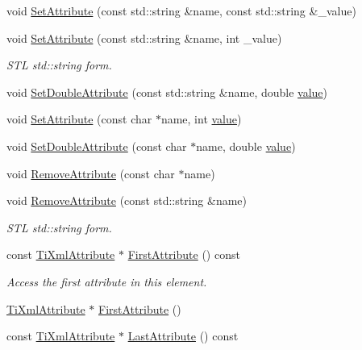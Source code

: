 \begin{DoxyCompactItemize}
\item 
void \hyperlink{class_ti_xml_element_a80ed65b1d194c71c6c9986ae42337d7d}{Set\-Attribute} (const std\-::string \&name, const std\-::string \&\-\_\-value)
\item 
void \hyperlink{class_ti_xml_element_a6f18d54fbe25bbc527936ee65363b3c5}{Set\-Attribute} (const std\-::string \&name, int \-\_\-value)
\begin{DoxyCompactList}\small\item\em S\-T\-L std\-::string form. \end{DoxyCompactList}\item 
void \hyperlink{class_ti_xml_element_ac2112d423b39a93012b241f6baf4d3d3}{Set\-Double\-Attribute} (const std\-::string \&name, double \hyperlink{class_ti_xml_node_aead528b3cedc33c16a6c539872c7cc8b}{value})
\item 
void \hyperlink{class_ti_xml_element_ace6f4be75e373726d4774073d666d1a7}{Set\-Attribute} (const char $\ast$name, int \hyperlink{class_ti_xml_node_aead528b3cedc33c16a6c539872c7cc8b}{value})
\item 
void \hyperlink{class_ti_xml_element_a0d1dd975d75496778177e35abfe0ec0b}{Set\-Double\-Attribute} (const char $\ast$name, double \hyperlink{class_ti_xml_node_aead528b3cedc33c16a6c539872c7cc8b}{value})
\item 
void \hyperlink{class_ti_xml_element_a56979767deca794376b1dfa69a525b2a}{Remove\-Attribute} (const char $\ast$name)
\item 
void \hyperlink{class_ti_xml_element_a1afa6aea716511326a608e4c05df4f3a}{Remove\-Attribute} (const std\-::string \&name)
\begin{DoxyCompactList}\small\item\em S\-T\-L std\-::string form. \end{DoxyCompactList}\item 
const \hyperlink{class_ti_xml_attribute}{Ti\-Xml\-Attribute} $\ast$ \hyperlink{class_ti_xml_element_a516054c9073647d6cb29b6abe9fa0592}{First\-Attribute} () const 
\begin{DoxyCompactList}\small\item\em Access the first attribute in this element. \end{DoxyCompactList}\item 
\hyperlink{class_ti_xml_attribute}{Ti\-Xml\-Attribute} $\ast$ \hyperlink{class_ti_xml_element_a4b33780fc565d38d6b54f640e0cf1737}{First\-Attribute} ()
\item 
const \hyperlink{class_ti_xml_attribute}{Ti\-Xml\-Attribute} $\ast$ \hyperlink{class_ti_xml_element_a86191b49f9177be132b85b14655f1381}{Last\-Attribute} () const 

\end{DoxyCompactItemize}
